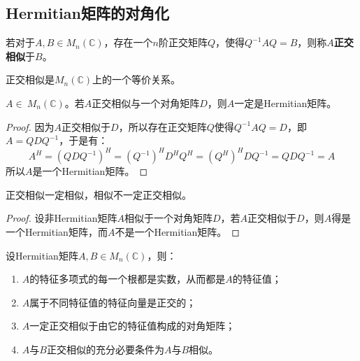\subsection{Hermitian矩阵的对角化}
\begin{definition}
	若对于$A,B\in M_{n}(\mathbb{C})$，存在一个$n$阶正交矩阵$Q$，使得$Q^{-1}AQ=B$，则称$A$\textbf{正交相似}于$B$。
\end{definition}
\begin{theorem}
	正交相似是$M_{n}(\mathbb{C})$上的一个等价关系。
\end{theorem}
\begin{theorem}
	$A\in\ M_n(\mathbb{C})$。若$A$正交相似与一个对角矩阵$D$，则$A$一定是Hermitian矩阵。
\end{theorem}
\begin{proof}
	因为$A$正交相似于$D$，所以存在正交矩阵$Q$使得$Q^{-1}AQ=D$，即$A=QDQ^{-1}$，于是有：
	\begin{equation*}
		A^H=(QDQ^{-1})^H=(Q^{-1})^HD^HQ^H=(Q^H)^HDQ^{-1}=QDQ^{-1}=A
	\end{equation*}
	所以$A$是一个Hermitian矩阵。
\end{proof}
\begin{corollary}
	正交相似一定相似，相似不一定正交相似。
\end{corollary}
\begin{proof}
	设非Hermitian矩阵$A$相似于一个对角矩阵$D$，若$A$正交相似于$D$，则$A$得是一个Hermitian矩阵，而$A$不是一个Hermitian矩阵。
\end{proof}
\begin{property}\label{prop:HermitianMatEigen}
	设Hermitian矩阵$A,B\in M_{n}(\mathbb{C})$，则：
	\begin{enumerate}
		\item $A$的特征多项式的每一个根都是实数，从而都是$A$的特征值；
		\item $A$属于不同特征值的特征向量是正交的；
		\item $A$一定正交相似于由它的特征值构成的对角矩阵；
		\item $A$与$B$正交相似的充分必要条件为$A$与$B$相似。
	\end{enumerate}
\end{property}

